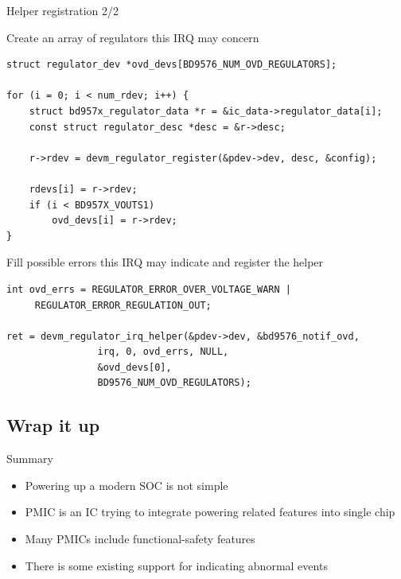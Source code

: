 \documentclass[10pt]{beamer}
\begin{document}
\begin{frame}[fragile]{Helper registration 2/2}


\lstset{language=C}

Create an array of regulators this IRQ may concern
\scriptsize

\pause
\begin{lstlisting}
struct regulator_dev *ovd_devs[BD9576_NUM_OVD_REGULATORS];

for (i = 0; i < num_rdev; i++) {
	struct bd957x_regulator_data *r = &ic_data->regulator_data[i];
	const struct regulator_desc *desc = &r->desc;

	r->rdev = devm_regulator_register(&pdev->dev, desc, &config);

	rdevs[i] = r->rdev;
	if (i < BD957X_VOUTS1)
		ovd_devs[i] = r->rdev;
}
\end{lstlisting}
\pause
\normalsize
Fill possible errors this IRQ may indicate and register the helper
\scriptsize

\pause
\begin{lstlisting}
int ovd_errs = REGULATOR_ERROR_OVER_VOLTAGE_WARN |
	 REGULATOR_ERROR_REGULATION_OUT;

ret = devm_regulator_irq_helper(&pdev->dev, &bd9576_notif_ovd,
				irq, 0, ovd_errs, NULL,
				&ovd_devs[0],
				BD9576_NUM_OVD_REGULATORS);

\end{lstlisting}
\end{frame}


\addtocounter{framenumber}{-1}
\begin{frame}[plain]
\section{Wrap it up}
\end{frame}

\begin{frame}{Summary}
\begin{itemize}
	\item Powering up a modern SOC is not simple
	\item PMIC is an IC trying to integrate powering related features into single chip
	\item Many PMICs include functional-safety features
	\item There is some existing support for indicating abnormal events
\end{itemize}
\end{frame}
\end{document}

